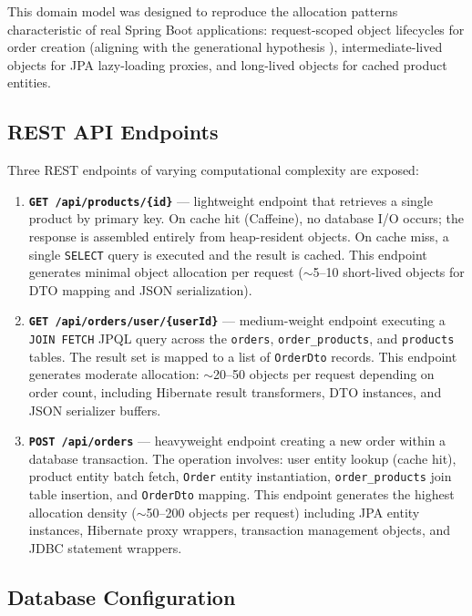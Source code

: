 This domain model was designed to reproduce the allocation patterns characteristic of real Spring Boot applications: request-scoped object lifecycles for order creation (aligning with the generational hypothesis \cite{jones2011garbage, ungar1984generation}), intermediate-lived objects for JPA lazy-loading proxies, and long-lived objects for cached product entities.

\subsection{REST API Endpoints}
\label{subsec:endpoints}

Three REST endpoints of varying computational complexity are exposed:

\begin{enumerate}
    \item \textbf{\texttt{GET /api/products/\{id\}}} --- lightweight endpoint that retrieves a single product by primary key. On cache hit (Caffeine), no database I/O occurs; the response is assembled entirely from heap-resident objects. On cache miss, a single \texttt{SELECT} query is executed and the result is cached. This endpoint generates minimal object allocation per request ($\sim$5--10 short-lived objects for DTO mapping and JSON serialization).

    \item \textbf{\texttt{GET /api/orders/user/\{userId\}}} --- medium-weight endpoint executing a \texttt{JOIN FETCH} JPQL query across the \texttt{orders}, \texttt{order\_products}, and \texttt{products} tables. The result set is mapped to a list of \texttt{OrderDto} records. This endpoint generates moderate allocation: $\sim$20--50 objects per request depending on order count, including Hibernate result transformers, DTO instances, and JSON serializer buffers.

    \item \textbf{\texttt{POST /api/orders}} --- heavyweight endpoint creating a new order within a database transaction. The operation involves: user entity lookup (cache hit), product entity batch fetch, \texttt{Order} entity instantiation, \texttt{order\_products} join table insertion, and \texttt{OrderDto} mapping. This endpoint generates the highest allocation density ($\sim$50--200 objects per request) including JPA entity instances, Hibernate proxy wrappers, transaction management objects, and JDBC statement wrappers.
\end{enumerate}

\subsection{Database Configuration}
\label{subsec:db-config}

